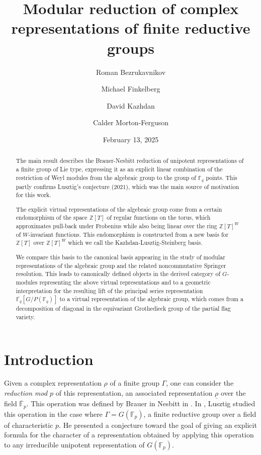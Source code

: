 \documentclass{amsart}
\title[Modular reduction of representations of finite reductive groups]{Modular reduction of complex representations of finite reductive groups}
\date{February 13, 2025}
\author[R. Bezrukavnikov]{Roman Bezrukavnikov}
\author[M.Finkelberg]{Michael Finkelberg}
\author[D. Kazhdan]{David Kazhdan}
\author[C. Morton-Ferguson]{Calder Morton-Ferguson}
\theoremstyle{definition}
\begin{document}
\begin{abstract}

The main result describes the Brauer-Nesbitt reduction of unipotent representations of a finite group of Lie type, expressing it as an explicit linear combination of the restriction
of Weyl modules from the algebraic group to the group of $\mathbb{F}_q$ points. 
This partly confirms Lusztig's conjecture (2021), which was the main source of motivation 
for this work.

The explicit virtual representations of the algebraic group come from a certain endomorphism
of the space ${\mathbb Z}[T]$ of regular functions on the torus, which approximates pull-back under Frobenius while also being linear over the ring
${\mathbb Z}[T]^W$ of $W$-invariant functions. This endomorphism is constructed from a new basis
for ${\mathbb Z}[T]$ over ${\mathbb Z}[T]^W$ which we call the Kazhdan-Lusztig-Steinberg basis.

We compare this basis to the canonical basis appearing in the study of modular representations of the algebraic group and  the related noncommutative Springer resolution. This leads
to canonically defined objects in the derived category of $G$-modules representing the above virtual representations and to  a geometric interpretation for the resulting lift of the principal series representation $\overline{\mathbb{F}_q} [G/P(\mathbb{F}_q)]$ to a virtual representation of the algebraic group, which comes from a decomposition of diagonal in the equivariant Grothedieck group of the partial flag variety.
\end{abstract}

\maketitle

\setcounter{tocdepth}{1}
\tableofcontents

\section{Introduction}

Given a complex representation $\rho$ of a finite group $\Gamma$, one can consider the \emph{reduction mod $p$} of this representation, an associated representation $\underline{\rho}$ over the field $\overline{\mathbb{F}}_p$. This operation was defined by Brauer in Nesbitt in \cite{BN}. In \cite{L}, Lusztig studied this operation in the case where $\Gamma = G(\mathbb{F}_p)$, a finite reductive group over a field of characteristic $p$. He presented a conjecture toward the goal of giving an explicit formula for the character of a representation obtained by applying this operation to any irreducible unipotent representation of $G(\mathbb{F}_p)$.
\end{document}
